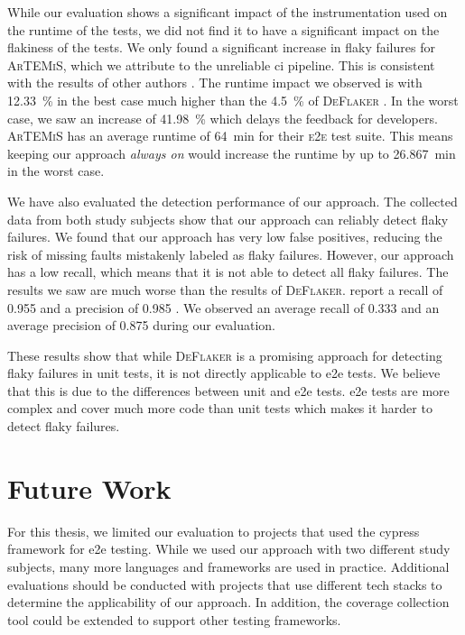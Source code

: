 While our evaluation shows a significant impact of the instrumentation used on the runtime of the tests, we did not find it to have a significant impact on the flakiness of the tests.
We only found a significant increase in flaky failures for \textsc{ArTEMiS}, which we attribute to the unreliable \ac{ci} pipeline.
This is consistent with the results of other authors \autocite{rasheed_effect_2023}.
The runtime impact we observed is with \SI{12.33}{\percent} in the best case much higher than the \SI{4.5}{\percent} of \textsc{DeFlaker} \autocite{bell_deflaker_2018}.
In the worst case, we saw an increase of \SI{41.98}{\percent} which delays the feedback for developers.
\textsc{ArTEMiS} has an average runtime of \SI{64}{\minute} for their \textsc{e2e} test suite.
This means keeping our approach \textit{always on} would increase the runtime by up to \SI{26.867}{\minute} in the worst case.

We have also evaluated the detection performance of our approach.
The collected data from both study subjects show that our approach can reliably detect flaky failures.
We found that our approach has very low false positives, reducing the risk of missing faults mistakenly labeled as flaky failures.
However, our approach has a low recall, which means that it is not able to detect all flaky failures.
The results we saw are much worse than the results of \textsc{DeFlaker}.
 report a recall of \num{0.955} and a precision of \num{0.985} \cite{bell_deflaker_2018}.
We observed an average recall of \num{0.333} and an average precision of \num{0.875} during our evaluation.

These results show that while \textsc{DeFlaker} is a promising approach for detecting flaky failures in unit tests, it is not directly applicable to \ac{e2e} tests.
We believe that this is due to the differences between unit and \ac{e2e} tests.
\Ac{e2e} tests are more complex and cover much more code than unit tests which makes it harder to detect flaky failures.

\section{Future Work}
For this thesis, we limited our evaluation to projects that used the cypress framework for \ac{e2e} testing.
While we used our approach with two different study subjects, many more languages and frameworks are used in practice.
Additional evaluations should be conducted with projects that use different tech stacks to determine the applicability of our approach.
In addition, the coverage collection tool could be extended to support other testing frameworks.

